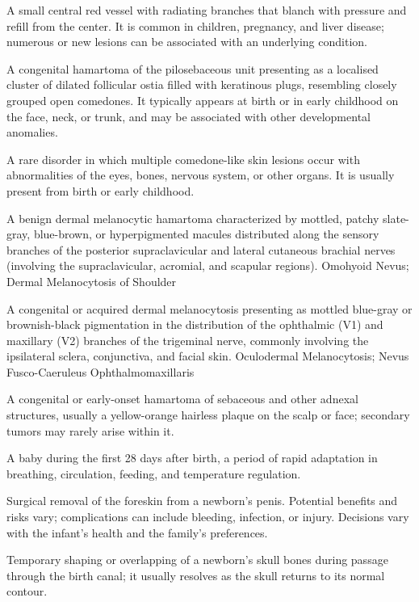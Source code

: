  A small central red vessel with radiating branches that blanch with pressure and refill from the center. It is common in children, pregnancy, and liver disease; numerous or new lesions can be associated with an underlying condition.

 A congenital hamartoma of the pilosebaceous unit presenting as a localised cluster of
dilated follicular ostia filled with keratinous plugs, resembling closely grouped open
comedones. It typically appears at birth or in early childhood on the face, neck, or
trunk, and may be associated with other developmental anomalies.

 A rare disorder in which multiple comedone-like skin lesions occur with abnormalities of the eyes, bones, nervous system, or other organs. It is usually present from birth or early childhood.

 A benign dermal melanocytic hamartoma characterized by mottled, patchy slate-gray, blue-brown, or hyperpigmented macules distributed along the sensory branches of the posterior supraclavicular and lateral cutaneous brachial nerves (involving the supraclavicular, acromial, and scapular regions).
\synonyms
Omohyoid Nevus; Dermal Melanocytosis of Shoulder

 A congenital or acquired dermal melanocytosis presenting as mottled blue-gray or brownish-black pigmentation in the distribution of the ophthalmic (V1) and maxillary (V2) branches of the trigeminal nerve, commonly involving the ipsilateral sclera, conjunctiva, and facial skin.
\synonyms
Oculodermal Melanocytosis; Nevus Fusco-Caeruleus Ophthalmomaxillaris

 A congenital or early-onset hamartoma of sebaceous and other adnexal structures, usually a yellow-orange hairless plaque on the scalp or face; secondary tumors may rarely arise within it.

 A baby during the first 28 days after birth, a period of rapid adaptation in breathing, circulation, feeding, and temperature regulation.

 Surgical removal of the foreskin from a newborn's penis. Potential benefits and risks vary; complications can include bleeding, infection, or injury. Decisions vary with the infant's health and the family's preferences.

 Temporary shaping or overlapping of a newborn’s skull bones during passage through the birth canal; it usually resolves as the skull returns to its normal contour.

